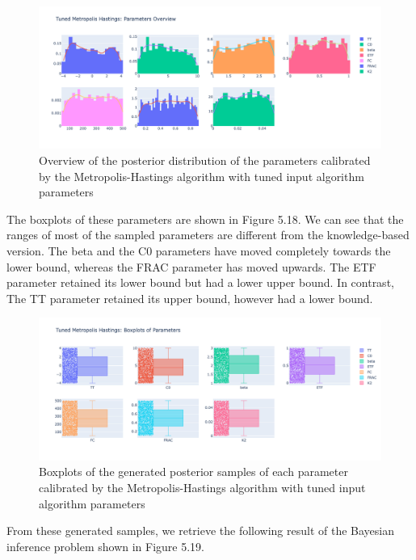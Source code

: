 \begin{figure}[H]
    \centering
    \includegraphics[width=1\textwidth]{figures/basic_mh/tuned_mh/tuned_mh_parameters_overview.png}
    \captionsetup{width=.8\textwidth}
    \caption{Overview of the posterior distribution of the parameters calibrated by the Metropolis-Hastings algorithm with tuned input algorithm parameters}
    \label{fig:enter-label}
\end{figure}


The boxplots of these parameters are shown in Figure 5.18. We can see that the ranges of most of the sampled parameters are different from the knowledge-based version. The beta and the C0 parameters have moved completely towards the lower bound, whereas the FRAC parameter has moved upwards. The ETF parameter retained its lower bound but had a lower upper bound. In contrast, The TT parameter retained its upper bound, however had a lower bound.


\begin{figure}[H]
    \centering
    \includegraphics[width=1\textwidth]{figures/basic_mh/tuned_mh/tuned_mh_boxplot.png}
    \captionsetup{width=.8\textwidth}
    \caption{Boxplots of the generated posterior samples of each parameter calibrated by the Metropolis-Hastings algorithm with tuned input algorithm parameters}
    \label{fig:enter-label}
\end{figure}


From these generated samples, we retrieve the following result of the Bayesian inference problem shown in Figure 5.19.

